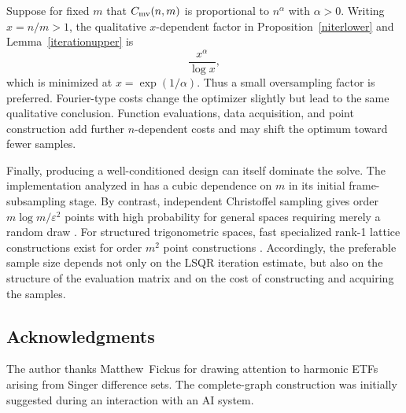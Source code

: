 \documentclass[a4paper]{amsart}
\numberwithin{equation}{section}
\begin{document}
Suppose for fixed $m$ that $C_{\rm mv}(n,m)$ is proportional to $n^\alpha$ with $\alpha>0$.
Writing $x=n/m>1$, the qualitative $x$-dependent factor in Proposition~\ref{niterlower} and Lemma~\ref{iterationupper} is
\begin{equation*}
    \frac{x^\alpha}{\log x},
\end{equation*}
which is minimized at $x=\exp(1/\alpha)$.
Thus a small oversampling factor is preferred.
Fourier-type costs change the optimizer slightly but lead to the same qualitative conclusion.
Function evaluations, data acquisition, and point construction add further $n$-dependent costs and may shift the optimum toward fewer samples.

Finally, producing a well-conditioned design can itself dominate the solve.
The implementation analyzed in \cite{BSU23} has a cubic dependence on $m$ in its initial frame-subsampling stage.
By contrast, independent Christoffel sampling gives order $m\log m/\varepsilon^2$ points with high probability for general spaces requiring merely a random draw \cite{CDL13}.
For structured trigonometric spaces, fast specialized rank-1 lattice constructions exist for order $m^2$ point constructions \cite{Kaemmerer20}.
Accordingly, the preferable sample size depends not only on the LSQR iteration estimate, but also on the structure of the evaluation matrix and on the cost of constructing and acquiring the samples.
 
\subsection*{Acknowledgments}

The author thanks Matthew~Fickus for drawing attention to harmonic ETFs arising from Singer difference sets.
The complete-graph construction was initially suggested during an interaction with an AI system.

\printbibliography
\end{document}
